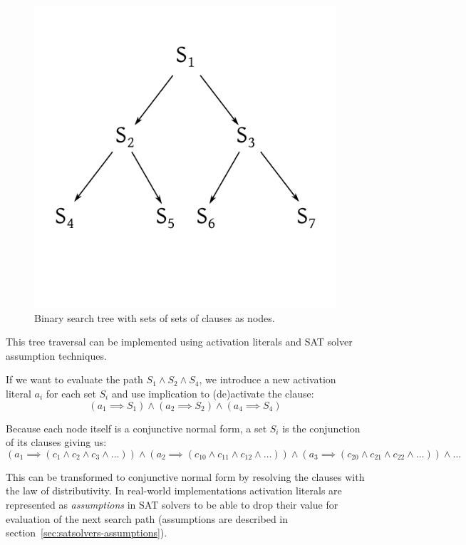 \begin{figure}[h]
  \begin{center}
    \includegraphics{img/searchtree.pdf}
    \caption{Binary search tree with sets of sets of clauses as nodes.}
    \label{fig:bintree_clauses}
  \end{center}
\end{figure}

This tree traversal can be implemented using activation literals and SAT solver assumption techniques.

If we want to evaluate the path $S_1 \land S_2 \land S_4$, we introduce a new activation literal $a_i$ for each set $S_i$ and use implication to (de)activate the clause:
%
\[
  (a_1 \implies S_1) \land (a_2 \implies S_2) \land (a_4 \implies S_4)
\]

Because each node itself is a conjunctive normal form, a set $S_i$ is the conjunction of its clauses giving us:
%
\[
  (a_1 \implies (c_1 \land c_2 \land c_3 \land \ldots)) \land
    (a_2 \implies (c_{10} \land c_{11} \land c_{12} \land \ldots)) \land
    (a_3 \implies (c_{20} \land c_{21} \land c_{22} \land \ldots)) \land
    \ldots
\]

This can be transformed to conjunctive normal form by resolving the clauses with the law of distributivity. In real-world implementations activation literals are represented as \emph{assumptions} in SAT solvers
to be able to drop their value for evaluation of the next search path (assumptions are described in section~\ref{sec:satsolvers-assumptions}).

